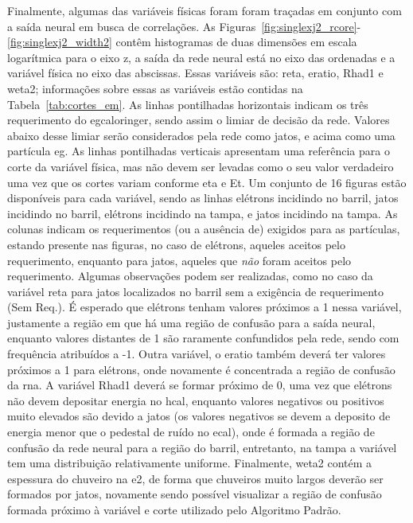 Finalmente, algumas das variáveis físicas foram foram traçadas em conjunto com
a saída neural em busca de correlações. As
Figuras~\ref{fig:singlexj2_rcore}-\ref{fig:singlexj2_width2} contêm histogramas
de duas dimensões em escala logarítmica para o eixo z, 
a saída da rede neural está no eixo das ordenadas e a
variável física no eixo das abscissas. Essas variáveis são: \gls{reta},
\gls{eratio}, \gls{Rhad1} e \gls{weta2}; informações sobre essas as variáveis estão
contidas na Tabela~\ref{tab:cortes_em}. As linhas pontilhadas horizontais
indicam os três requerimento do \gls{egcaloringer}, sendo assim o limiar de
decisão da rede. Valores abaixo desse limiar serão considerados pela rede como
jatos, e acima como uma partícula \gls{eg}. As linhas pontilhadas verticais
apresentam uma referência para o corte da variável física, mas não devem ser
levadas como o seu valor verdadeiro uma vez que os cortes variam conforme
\gls{eta} e \gls{Et}. Um conjunto de 16 figuras estão
disponíveis para cada variável, sendo as linhas elétrons 
incidindo no barril, jatos incidindo no barril, elétrons incidindo na tampa, e
jatos incidindo na tampa. As colunas indicam os requerimentos (ou a ausência de) exigidos para as
partículas, estando presente nas figuras, no caso de elétrons, aqueles aceitos pelo 
requerimento, enquanto para jatos, aqueles que \emph{não} foram aceitos pelo
requerimento. Algumas observações podem ser realizadas, como no caso da variável
\gls{reta} para jatos localizados no
barril sem a exigência de requerimento (Sem Req.). É esperado que elétrons
tenham valores próximos a 1 nessa variável, justamente a região em que há uma
região de confusão para a saída neural, enquanto valores distantes de 1 são
raramente confundidos pela rede, sendo com frequência atribuídos a -1. Outra
variável, o \gls{eratio} também deverá ter valores próximos a 1 para elétrons,
onde novamente é concentrada a região de confusão da \gls{rna}. A variável
\gls{Rhad1} deverá se formar próximo de 0, uma vez que elétrons não devem
depositar energia no \gls{hcal}, enquanto valores negativos ou positivos muito
elevados são devido a jatos (os valores negativos se devem a deposito de energia
menor que o pedestal de ruído no \gls{ecal}), onde é formada a região de
confusão da rede neural para a região do barril, entretanto, na tampa a variável
tem uma distribuição relativamente uniforme. Finalmente, \gls{weta2} contém a
espessura do chuveiro na \gls{e2}, de forma que chuveiros muito largos deverão
ser formados por jatos, novamente sendo possível visualizar a região de confusão
formada próximo à variável e corte utilizado pelo Algoritmo Padrão.



